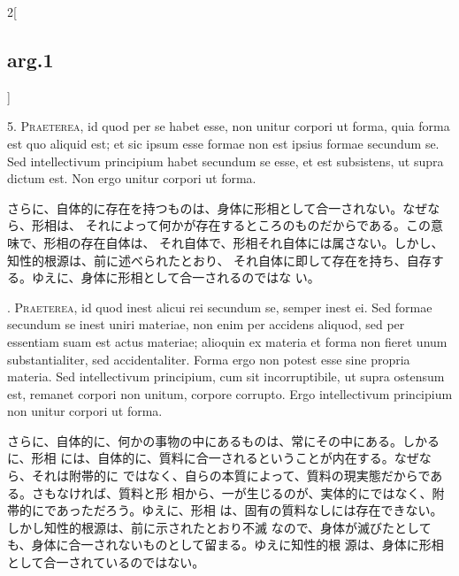 \documentclass[paper=a4paper,fontsize=10pt,jafontsize=9pt,titlepage]{jlreq}
\begin{document}
\begin{paracol}{2}[\subsection{arg.1}]

5. {\scshape Praeterea}, id quod per se habet esse, non unitur corpori ut forma,
quia forma est quo aliquid est; et sic ipsum esse formae non est ipsius formae
secundum se. Sed intellectivum principium habet secundum se esse, et est
subsistens, ut supra dictum est. Non ergo unitur corpori ut forma.
 
\switchcolumn

さらに、自体的に存在を持つものは、身体に形相として合一されない。なぜなら、形相は、
それによって何かが存在するところのものだからである。この意味で、形相の存在自体は、
それ自体で、形相それ自体には属さない。しかし、知性的根源は、前に述べられたとおり、
それ自体に即して存在を持ち、自存する。ゆえに、身体に形相として合一されるのではな
い。
 
. {\scshape Praeterea}, id quod inest alicui
rei secundum se, semper inest ei. Sed formae secundum se inest uniri materiae,
non enim per accidens aliquod, sed per essentiam suam est actus materiae;
alioquin ex materia et forma non fieret unum substantialiter, sed
accidentaliter. Forma ergo non potest esse sine propria materia. Sed
intellectivum principium, cum sit incorruptibile, ut supra ostensum est, remanet
corpori non unitum, corpore corrupto. Ergo intellectivum principium non unitur
corpori ut forma.

 \switchcolumn

 さらに、自体的に、何かの事物の中にあるものは、常にその中にある。しかるに、形相
 には、自体的に、質料に合一されるということが内在する。なぜなら、それは附帯的に
 ではなく、自らの本質によって、質料の現実態だからである。さもなければ、質料と形
 相から、一が生じるのが、実体的にではなく、附帯的にであっただろう。ゆえに、形相
 は、固有の質料なしには存在できない。しかし知性的根源は、前に示されたとおり不滅
 なので、身体が滅びたとしても、身体に合一されないものとして留まる。ゆえに知性的根
 源は、身体に形相として合一されているのではない。
 
\switchcolumn*[\subsection{s.c.}]


\end{paracol}
\end{document}
